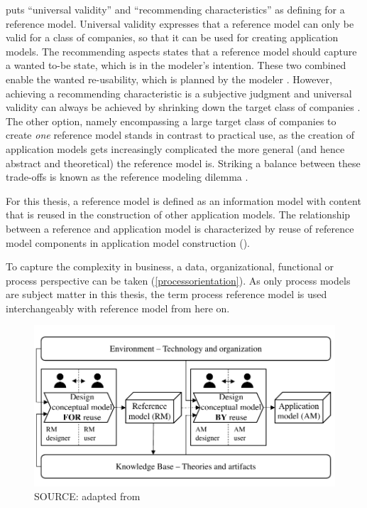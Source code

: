 			\citeauthor{Schutte1998} puts \enquote{universal validity} and \enquote{recommending characteristics} as defining  for a reference model. Universal validity expresses that a reference model can only be valid for a class of companies, so that it can be used for creating application models. The recommending aspects states that a reference model should capture a wanted to-be state, which is in the modeler's intention. These two combined enable the wanted re-usability, which is planned by the modeler \citep[]{vombrocke2003referenzmodellierung}. However, achieving a recommending characteristic is a subjective judgment and universal validity can always be achieved by shrinking down the target class of companies \citep{thomas2006a}. The other option, namely encompassing a large target class of companies to create \textit{one} reference model stands in contrast to practical use, as the creation of application models gets increasingly complicated the more general (and hence abstract and theoretical) \citep[]{Schutte1998} the reference model is. Striking a balance between these trade-offs is known as the reference modeling dilemma \citep{delfmann2006adaptive}. 
		
			For this thesis, a reference model is defined as an information model with content that is reused in the construction of other application models. The relationship between a reference and application model is characterized by reuse of reference model components in application model construction (\cf \cite{Puster2015, vombrocke2003referenzmodellierung}). 
			
			To capture the complexity in business, a data, organizational, functional or process perspective can be taken (\cf \ref{processorientation}). As only process models are subject matter in this thesis, the term process reference model is used interchangeably with reference model from here on. 
				  
				  
				  
				  \begin{figure}[caption={Design Process of Reusable Conceptual Models}, label={fig:refmodconst}]
				  	{	\includegraphics[width=.8\textwidth]{figures/refmodconst.pdf}}
				  	\hspace{6.2cm}	SOURCE:  adapted from \citep[]{vom2006reusable}
				  \end{figure} 
				  
